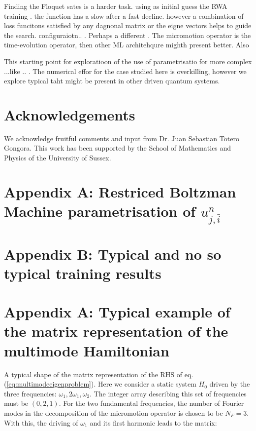 \documentclass[pra,twocolumn,showkeys,preprintnumbers, amsmath,amssymb, aps,A4paper]{revtex4-1}
\begin{document}
\begin{equaiton}
\begin{equaiton}
Finding the Floquet sates is a harder task. using as initial guess the RWA training . the function has a slow after a fast decline. however a combination of loss funcitons satisfied by any dagnonal matrix  or the eigne vectors helps to guide the search. configuraiotn.. . Perhaps a different . The micromotion operator is the time-evolution operator, then other ML architehqure mighth present better. Also

This starting point for exploratioon of the use of parametrisatio for more complex ...like .. .  The numerical effor for the case studied here is overkilling, however we explore typical taht might be present in other driven quantum systems. 






\section*{Acknowledgements}
We acknowledge fruitful comments and input from Dr. Juan Sebastian Totero Gongora. This work has been supported by the School of Mathematics and Physics of the University of Sussex.

\section*{Appendix A: Restriced Boltzman Machine parametrisation of $u^n_{j,\bar{i}}$}
\section*{Appendix B: Typical and no so typical training results}
\section*{Appendix A: Typical example of the matrix representation of the multimode Hamiltonian}

A typical shape of the matrix representation of the RHS of eq. (\ref{eq:multimodeeigenproblem}). Here we consider a static system $H_0$ driven by the three frequencies: $\omega_1,2\omega_1,\omega_2$. The integer array describing this set of frequencies must be $(0,2,1)$. For the two fundamental frequencies, the number of Fourier modes in the decomposition of the micromotion operator is chosen to be $N_F=3$. With this, the driving of  $\omega_1$ and its first harmonic leads to the matrix:


\end{equaiton}
\end{equaiton}
\end{document}
